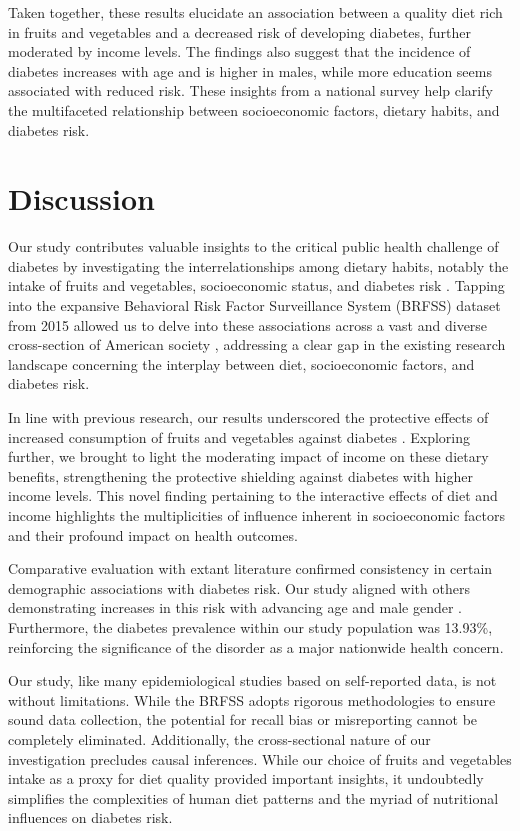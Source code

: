 \documentclass[11pt]{article}
\begin{document}
Taken together, these results elucidate an association between a quality diet rich in fruits and vegetables and a decreased risk of developing diabetes, further moderated by income levels. The findings also suggest that the incidence of diabetes increases with age and is higher in males, while more education seems associated with reduced risk. These insights from a national survey help clarify the multifaceted relationship between socioeconomic factors, dietary habits, and diabetes risk.

\section*{Discussion}

Our study contributes valuable insights to the critical public health challenge of diabetes by investigating the interrelationships among dietary habits, notably the intake of fruits and vegetables, socioeconomic status, and diabetes risk \cite{Akter2014PrevalenceOD, Bazzano2008IntakeOF, Carter2010FruitAV}. Tapping into the expansive Behavioral Risk Factor Surveillance System (BRFSS) dataset from 2015 allowed us to delve into these associations across a vast and diverse cross-section of American society \cite{Rolle-Lake2020BehavioralRF, Pierannunzi2013ASR}, addressing a clear gap in the existing research landscape concerning the interplay between diet, socioeconomic factors, and diabetes risk.

In line with previous research, our results underscored the protective effects of increased consumption of fruits and vegetables against diabetes \cite{Bazzano2008IntakeOF, Carter2010FruitAV}. Exploring further, we brought to light the moderating impact of income on these dietary benefits, strengthening the protective shielding against diabetes with higher income levels. This novel finding pertaining to the interactive effects of diet and income highlights the multiplicities of influence inherent in socioeconomic factors and their profound impact on health outcomes. 

Comparative evaluation with extant literature confirmed consistency in certain demographic associations with diabetes risk. Our study aligned with others demonstrating increases in this risk with advancing age and male gender \cite{Seiglie2020DiabetesPA, Chan1994ObesityFD}. Furthermore, the diabetes prevalence within our study population was 13.93\%, reinforcing the significance of the disorder as a major nationwide health concern.

Our study, like many epidemiological studies based on self-reported data, is not without limitations. While the BRFSS adopts rigorous methodologies to ensure sound data collection, the potential for recall bias or misreporting cannot be completely eliminated. Additionally, the cross-sectional nature of our investigation precludes causal inferences. While our choice of fruits and vegetables intake as a proxy for diet quality provided important insights, it undoubtedly simplifies the complexities of human diet patterns and the myriad of nutritional influences on diabetes risk.
\end{document}
